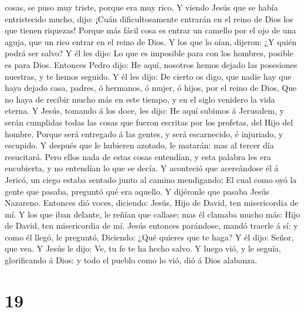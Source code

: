 cosas, se puso muy triste, porque era muy rico.  Y viendo
Jesús que se había entristecido mucho, dijo: ¡Cuán dificultosamente
entrarán en el reino de Dios los que tienen riquezas! 
Porque más fácil cosa es entrar un camello por el ojo de una aguja, que
un rico entrar en el reino de Dios.  Y los que lo oían,
dijeron: ¿Y quién podrá ser salvo?  Y él les dijo: Lo que
es imposible para con los hombres, posible es para Dios. 
Entonces Pedro dijo: He aquí, nosotros hemos dejado las posesiones
nuestras, y te hemos seguido.  Y él les dijo: De cierto
os digo, que nadie hay que haya dejado casa, padres, ó hermanos, ó
mujer, ó hijos, por el reino de Dios,  Que no haya de
recibir mucho más en este tiempo, y en el siglo venidero la vida eterna.
 Y Jesús, tomando á los doce, les dijo: He aquí subimos á
Jerusalem, y serán cumplidas todas las cosas que fueron escritas por los
profetas, del Hijo del hombre.  Porque será entregado á
las gentes, y será escarnecido, é injuriado, y escupido. 
Y después que le hubieren azotado, le matarán: mas al tercer día
resucitará.  Pero ellos nada de estas cosas entendían, y
esta palabra les era encubierta, y no entendían lo que se decía.
 Y aconteció que acercándose él á Jericó, un ciego estaba
sentado junto al camino mendigando;  El cual como oyó la
gente que pasaba, preguntó qué era aquello.  Y dijéronle
que pasaba Jesús Nazareno.  Entonces dió voces, diciendo:
Jesús, Hijo de David, ten misericordia de mí.  Y los que
iban delante, le reñían que callase; mas él clamaba mucho más: Hijo de
David, ten misericordia de mí.  Jesús entonces parándose,
mandó traerle á sí: y como él llegó, le preguntó, 
Diciendo: ¿Qué quieres que te haga? Y él dijo: Señor, que vea.
 Y Jesús le dijo: Ve, tu fe te ha hecho salvo.
 Y luego vió, y le seguía, glorificando á Dios: y todo el
pueblo como lo vió, dió á Dios alabanza.

\hypertarget{section-18}{%
\section{19}\label{section-18}}

